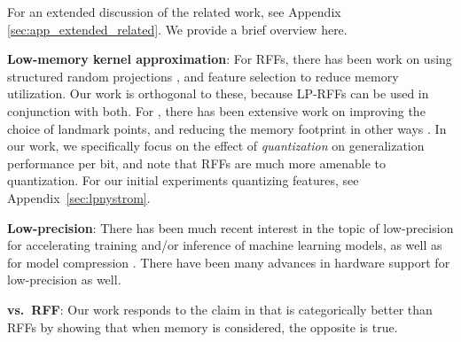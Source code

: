 For an extended discussion of the related work, see Appendix \ref{sec:app_extended_related}. We provide a brief overview here.

\textbf{Low-memory kernel approximation}: For RFFs, there has been work on using structured random projections \citep{fastfood,yu15,sphereRKS}, and feature selection \citep{sparseRKS, may2016} to reduce memory utilization. Our work is orthogonal to these, because LP-RFFs can be used in conjunction with both. For \NystromNS, there has been extensive work on improving the choice of landmark points, and reducing the memory footprint in other ways \cite{ensemble09,fastpred14,meka14}. In our work, we specifically focus on the effect of \textit{quantization} on generalization performance per bit, and note that RFFs are much more amenable to quantization. For our initial experiments quantizing \Nystrom features, see Appendix~\ref{sec:lpnystrom}.

\textbf{Low-precision}: There has been much recent interest in the topic of low-precision for accelerating training and/or inference of machine learning models, as well as for model compression \citep{gupta15,hogwild15,hubara16,halp18,desa17,han15}.  There have been many advances in hardware support for low-precision as well\citep{tpu17,brainwave17}.

\textbf{\Nystrom vs.\ RFF}: Our work responds to the claim in \citet{nysvsrff12} that \Nystrom is categorically better than RFFs by showing that when memory is considered, the opposite is true.

